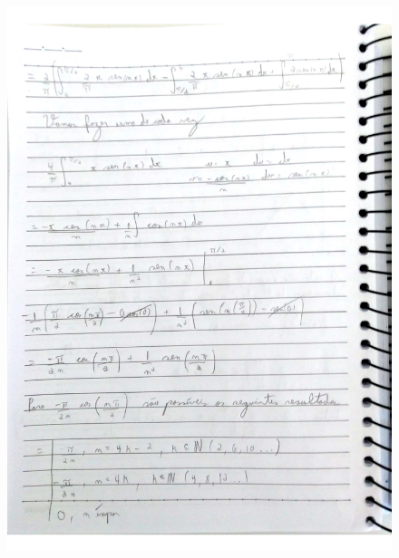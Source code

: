 \documentclass[a4paper]{article}
\begin{document}
        \begin{figure}{\textwidth}
            \centering
            \includegraphics[width=\textwidth]{Questoes-1-3_page-0008.jpg}
        \end{figure}
\end{document}
